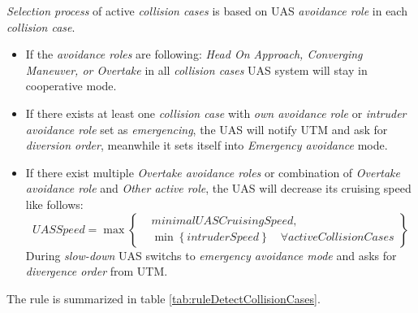 \emph{Selection process} of active \emph{collision cases} is based on UAS \emph{avoidance role} in each \emph{collision case}.
\begin{itemize}
    \item If the \emph{avoidance roles} are following: \emph{Head On Approach, Converging Maneuver, or Overtake} in all \emph{collision cases} UAS system will stay in cooperative mode.
    \item If there exists at least one \emph{collision case} with \emph{own avoidance role} or \emph{intruder avoidance role} set as \emph{emergencing}, the UAS will notify UTM and ask for \emph{diversion order}, meanwhile it sets itself into \emph{Emergency avoidance} mode.
    \item If there exist multiple \emph{Overtake avoidance roles} or combination of \emph{Overtake avoidance role} and \emph{Other active role}, the UAS will decrease its cruising speed like follows:
    \begin{equation}
        UASSpeed = \max \left\{\begin{aligned}
        & minimalUASCruisingSpeed,\\
        &\min \left\{intruderSpeed\right\}\quad \forall activeCollisionCases
        \end{aligned}
        \right\}
    \end{equation}
    During \emph{slow-down} UAS switchs to \emph{emergency avoidance mode} and asks for \emph{divergence order} from UTM.
\end{itemize}

\newpage
\noindent The rule is summarized in table \ref{tab:ruleDetectCollisionCases}.

